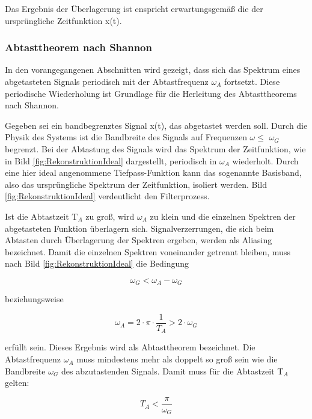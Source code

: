 \noindent Das Ergebnis der Überlagerung ist enspricht erwartungsgemä{\ss} die der ursprüngliche Zeitfunktion x(t).


\subsubsection{Abtasttheorem nach Shannon}

\noindent In den vorangegangenen Abschnitten wird gezeigt, dass sich das Spektrum eines abgetasteten Signals periodisch mit der Abtastfrequenz $\omega_{A}$ fortsetzt. Diese periodische Wiederholung ist Grundlage für die Herleitung des Abtasttheorems nach Shannon.

\noindent Gegeben sei ein bandbegrenztes Signal x(t), das abgetastet werden soll. Durch die Physik des Systems ist die Bandbreite des Signals auf Frequenzen $\omega\mathrm{\le}$ $\omega_{G}$ begrenzt. Bei der Abtastung des Signals wird das Spektrum der Zeitfunktion, wie in Bild \ref{fig:RekonstruktionIdeal} dargestellt, periodisch in $\omega_{A}$ wiederholt. Durch eine hier ideal angenommene Tiefpass-Funktion kann das sogenannte Basisband, also das ursprüngliche Spektrum der Zeitfunktion, isoliert werden. Bild \ref{fig:RekonstruktionIdeal} verdeutlicht den Filterprozess.

\noindent Ist die Abtastzeit T${}_{A}$ zu gro{\ss}, wird $\omega_{A}$ zu klein und die einzelnen Spektren der abgetasteten Funktion überlagern sich. Signalverzerrungen, die sich beim Abtasten durch Überlagerung der Spektren ergeben, werden als Aliasing bezeichnet. Damit die einzelnen Spektren voneinander getrennt bleiben, muss nach Bild \ref{fig:RekonstruktionIdeal} die Bedingung 

\begin{equation}\label{eq:twofifteen}
\omega _{G} <\omega _{A} -\omega _{G}
\end{equation}

\noindent beziehungsweise 

\begin{equation}\label{eq:twosixteen}
\omega _{A} =2\cdot \pi \cdot \frac{1}{T_{A} } >2\cdot \omega _{G}
\end{equation}

\noindent erfüllt sein. Dieses Ergebnis wird als Abtasttheorem bezeichnet. Die Abtastfrequenz $\omega_{A}$ muss mindestens mehr als doppelt so gro{\ss} sein wie die Bandbreite $\omega_{G}$ des abzutastenden Signals. Damit muss für die Abtastzeit T$_{A}$ gelten: 

\begin{equation}\label{eq:twoseventeen}
T_{A} <\frac{\pi }{\omega _{G} } 
\end{equation}

